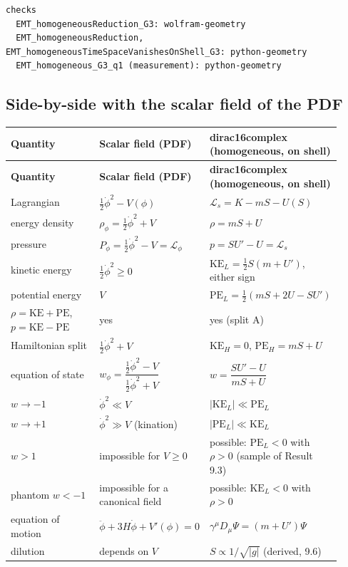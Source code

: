 \documentclass[11pt]{article}
\begin{document}
\begin{Verbatim}[fontsize=\small]
checks
  EMT_homogeneousReduction_G3: wolfram-geometry
  EMT_homogeneousReduction, EMT_homogeneousTimeSpaceVanishesOnShell_G3: python-geometry
  EMT_homogeneous_G3_q1 (measurement): python-geometry
\end{Verbatim}

\subsection{Side-by-side with the scalar field of the PDF}

\begin{longtable}{@{}p{0.307\linewidth}p{0.307\linewidth}p{0.307\linewidth}@{}}
\toprule
\textbf{Quantity} & \textbf{Scalar field (PDF)} & \textbf{dirac16complex (homogeneous, on shell)} \\
\midrule
\endfirsthead
\toprule
\textbf{Quantity} & \textbf{Scalar field (PDF)} & \textbf{dirac16complex (homogeneous, on shell)} \\
\midrule
\endhead
Lagrangian & $\tfrac12\dot\phi^2-V(\phi)$ & $\mathcal L_s=K-mS-U(S)$ \\
energy density & $\rho_\phi=\tfrac12\dot\phi^2+V$ & $\rho=mS+U$ \\
pressure & $P_\phi=\tfrac12\dot\phi^2-V=\mathcal L_\phi$ & $p=SU'-U=\mathcal L_s$ \\
kinetic energy & $\tfrac12\dot\phi^2\ge0$ & $\mathrm{KE}_L=\tfrac12S(m+U')$, either sign \\
potential energy & $V$ & $\mathrm{PE}_L=\tfrac12(mS+2U-SU')$ \\
$\rho=\mathrm{KE}+\mathrm{PE}$, $p=\mathrm{KE}-\mathrm{PE}$ & yes & yes (split A) \\
Hamiltonian split & $\tfrac12\dot\phi^2+V$ & $\mathrm{KE}_H=0$, $\mathrm{PE}_H=mS+U$ \\
equation of state & $w_\phi=\dfrac{\tfrac12\dot\phi^2-V}{\tfrac12\dot\phi^2+V}$ & $w=\dfrac{SU'-U}{mS+U}$ \\
$w\to-1$ & $\dot\phi^2\ll V$ & $\lvert\mathrm{KE}_L\rvert\ll\mathrm{PE}_L$ \\
$w\to+1$ & $\dot\phi^2\gg V$ (kination) & $\lvert\mathrm{PE}_L\rvert\ll\mathrm{KE}_L$ \\
$w>1$ & impossible for $V\ge0$ & possible: $\mathrm{PE}_L<0$ with $\rho>0$ (sample of Result 9.3) \\
phantom $w<-1$ & impossible for a canonical field & possible: $\mathrm{KE}_L<0$ with $\rho>0$ \\
equation of motion & $\ddot\phi+3H\dot\phi+V'(\phi)=0$ & $\gamma^\mu D_\mu\Psi=(m+U')\Psi$ \\
dilution & depends on $V$ & $S\propto1/\sqrt{\lvert g\rvert}$ (derived, 9.6) \\
\bottomrule
\end{longtable}
\end{document}
